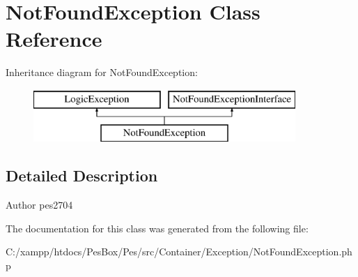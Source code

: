 \hypertarget{class_pes_1_1_container_1_1_exception_1_1_not_found_exception}{}\section{Not\+Found\+Exception Class Reference}
\label{class_pes_1_1_container_1_1_exception_1_1_not_found_exception}
Inheritance diagram for Not\+Found\+Exception\+:\begin{figure}[H]
\begin{center}
\leavevmode
\includegraphics[height=2.000000cm]{class_pes_1_1_container_1_1_exception_1_1_not_found_exception}
\end{center}
\end{figure}


\subsection{Detailed Description}
\begin{DoxyAuthor}{Author}
pes2704 
\end{DoxyAuthor}


The documentation for this class was generated from the following file\+:\begin{DoxyCompactItemize}
\item 
C\+:/xampp/htdocs/\+Pes\+Box/\+Pes/src/\+Container/\+Exception/Not\+Found\+Exception.\+php\end{DoxyCompactItemize}
